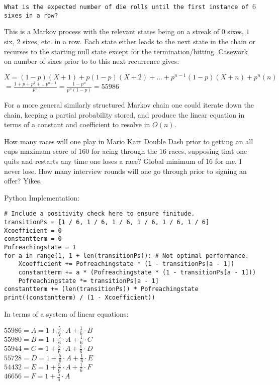 \texttt{What is the expected number of die rolls until the first instance of $6$ sixes in a row?}

This is a Markov process with the relevant states being on a streak of $0$ sixes, $1$ six, $2$ sixes, etc. in a row. Each state either leads to the next state in the chain or recurses to the starting null state except for the termination/hitting. Casework on number of sixes prior to to this next recurrence gives:

$X = (1-p)(X+1)+p(1-p)(X+2)+\dots+p^{n-1}(1-p)(X+n)+p^n(n)$ \\
$= \frac{1+p+p^2+\dots p^{n-1}}{p^n} = \frac{1-p^n}{p^n (1-p)} = \boxed{55986}$

For a more general similarly structured Markov chain one could iterate down the chain, keeping a partial probability stored, and produce the linear equation in terms of a constant and coefficient to resolve in $O(n)$.

How many races will one play in Mario Kart Double Dash prior to getting an all cups maximum score of $160$ for acing through the $16$ races, supposing that one quits and restarts any time one loses a race? Global minimum of $16$ for me, I never lose. How many interview rounds will one go through prior to signing an offer? Yikes.

Python Implementation:

\begin{verbatim}
# Include a positivity check here to ensure finitude.
transitionPs = [1 / 6, 1 / 6, 1 / 6, 1 / 6, 1 / 6, 1 / 6]
Xcoefficient = 0
constantterm = 0
Pofreachingstate = 1
for a in range(1, 1 + len(transitionPs)): # Not optimal performance.
    Xcoefficient += Pofreachingstate * (1 - transitionPs[a - 1])
    constantterm += a * (Pofreachingstate * (1 - transitionPs[a - 1]))
    Pofreachingstate *= transitionPs[a - 1]
constantterm += (len(transitionPs)) * Pofreachingstate
print((constantterm) / (1 - Xcoefficient))
\end{verbatim}

In terms of a system of linear equations:

$55986 = A = 1+\frac{5}{6} \cdot A+\frac{1}{6} \cdot B$ \\
$55980 = B = 1+\frac{5}{6} \cdot A+\frac{1}{6} \cdot C$ \\
$55944 = C = 1+\frac{5}{6} \cdot A+\frac{1}{6} \cdot D$ \\
$55728 = D = 1+\frac{5}{6} \cdot A+\frac{1}{6} \cdot E$ \\
$54432 = E = 1+\frac{5}{6} \cdot A+\frac{1}{6} \cdot F$ \\
$46656 = F = 1+\frac{5}{6} \cdot A$

